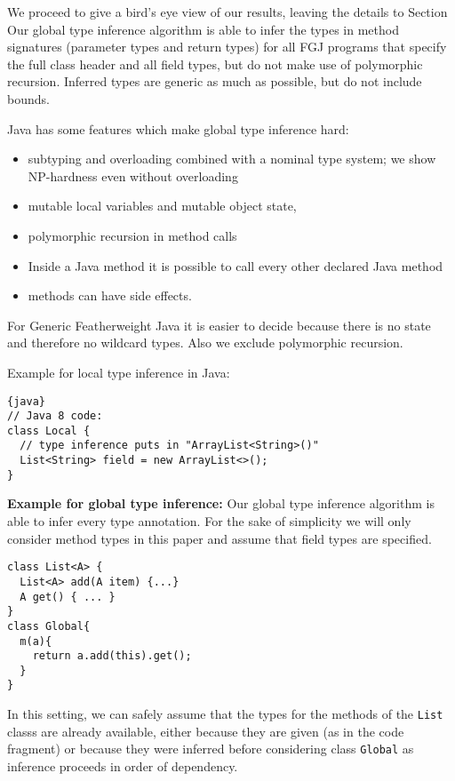 We proceed to give a bird's eye view of our results, leaving the
details to Section
Our global type inference algorithm is able to infer the types in
method signatures (parameter types and return types) for all
FGJ programs that specify the full class header and all field types,
but do not make use of polymorphic recursion.
Inferred types are generic as much as possible, but do not include bounds.


Java has some features which make global type inference hard:
\begin{itemize}
\item subtyping and overloading combined with a nominal type system;
  we show NP-hardness even without overloading
\item mutable local variables and mutable object state,
\item polymorphic recursion in method calls
\item Inside a Java method it is possible to call every other declared Java method
\item methods can have side effects.
\end{itemize}



For Generic Featherweight Java it is easier to decide because there is no state and therefore no wildcard types.
Also we exclude polymorphic recursion.

Example for local type inference in Java:
\begin{lstlisting}{java}
// Java 8 code:
class Local {
  // type inference puts in "ArrayList<String>()"
  List<String> field = new ArrayList<>();
}
\end{lstlisting}

\textbf{Example for global type inference:}
Our global type inference algorithm is able to infer every type annotation.
For the sake of simplicity we will only consider method types in this
paper and assume that field types are specified.
\begin{lstlisting}
class List<A> {
  List<A> add(A item) {...}
  A get() { ... }
}
class Global{
  m(a){
    return a.add(this).get();
  }
}
\end{lstlisting}
In this setting, we can safely assume that the types for the methods of the \lstinline{List} classs
are already available, either because they are given (as in the code
fragment) or because they were
inferred before considering class \lstinline{Global} as inference
proceeds in order of dependency.

